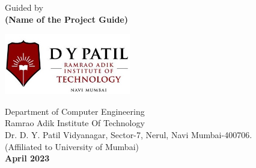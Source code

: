\begin{center}
\vspace{0.2in}
\large Guided by\\
\vspace{0.1in}
{\Large \bf (Name of the Project Guide)}\\
\vspace{0.2in}
\begin{center}
	\includegraphics[width=55mm, height=27mm,keepaspectratio]{rait_logo}
\end{center}
\vspace{0.2in}
\Large{Department of Computer Engineering}\\
\Large{Ramrao Adik Institute Of Technology}\\
{\normalsize Dr. D. Y. Patil Vidyanagar, Sector-7, Nerul, Navi Mumbai-400706.}\\
\normalsize{(Affiliated to University of Mumbai)}\\
\large\textbf{April 2023}
\end{center}
